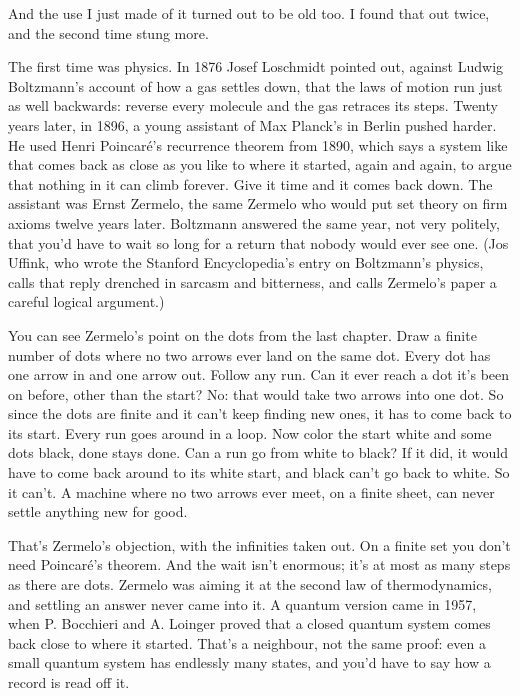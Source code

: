 \documentclass[11pt,twoside]{article}
\theoremstyle{thielethm}
\theoremstyle{thieledef}
\theoremstyle{thieledef}
\theoremstyle{thieledef}
\theoremstyle{thielethm}
\theoremstyle{thieleobs}
\theoremstyle{thielethm}
\begin{document}
And the use I just made of it turned out to be old too. I found that out twice, and the second time stung more.

The first time was physics. In 1876 Josef Loschmidt pointed out, against Ludwig Boltzmann's account of how a gas settles down, that the laws of motion run just as well backwards: reverse every molecule and the gas retraces its steps. Twenty years later, in 1896, a young assistant of Max Planck's in Berlin pushed harder. He used Henri Poincaré's recurrence theorem from 1890, which says a system like that comes back as close as you like to where it started, again and again, to argue that nothing in it can climb forever. Give it time and it comes back down. The assistant was Ernst Zermelo, the same Zermelo who would put set theory on firm axioms twelve years later. Boltzmann answered the same year, not very politely, that you'd have to wait so long for a return that nobody would ever see one. (Jos Uffink, who wrote the Stanford Encyclopedia's entry on Boltzmann's physics, calls that reply drenched in sarcasm and bitterness, and calls Zermelo's paper a careful logical argument.)

You can see Zermelo's point on the dots from the last chapter. Draw a finite number of dots where no two arrows ever land on the same dot. Every dot has one arrow in and one arrow out. Follow any run. Can it ever reach a dot it's been on before, other than the start? No: that would take two arrows into one dot. So since the dots are finite and it can't keep finding new ones, it has to come back to its start. Every run goes around in a loop. Now color the start white and some dots black, done stays done. Can a run go from white to black? If it did, it would have to come back around to its white start, and black can't go back to white. So it can't. A machine where no two arrows ever meet, on a finite sheet, can never settle anything new for good.

That's Zermelo's objection, with the infinities taken out. On a finite set you don't need Poincaré's theorem. And the wait isn't enormous; it's at most as many steps as there are dots. Zermelo was aiming it at the second law of thermodynamics, and settling an answer never came into it. A quantum version came in 1957, when P. Bocchieri and A. Loinger proved that a closed quantum system comes back close to where it started. That's a neighbour, not the same proof: even a small quantum system has endlessly many states, and you'd have to say how a record is read off it.
\end{document}
